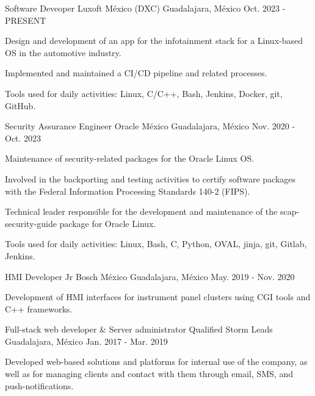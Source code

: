 \begin{cventries}
    \cventry
        {Software Deveoper}
        {Luxoft México (DXC)}
        {Guadalajara, México}
        {Oct. 2023 - PRESENT}
        {
            \begin{cvitems}
                \item {Design and development of an app for the infotainment stack for a Linux-based OS in the automotive industry.}
                \item {Implemented and maintained a CI/CD pipeline and related processes.}
                \item {Tools used for daily activities: Linux, C/C++, Bash, Jenkins, Docker, git, GitHub.}
            \end{cvitems}
        }
    \cventry
        {Security Assurance Engineer}
        {Oracle México}
        {Guadalajara, México}
        {Nov. 2020 - Oct. 2023}
        {
            \begin{cvitems}
                \item {Maintenance of security-related packages for the Oracle Linux OS.}
                \item {Involved in the backporting and testing activities to certify software packages with the Federal Information Processing Standards 140-2 (FIPS).}
                \item {Technical leader responsible for the development and maintenance of the scap-security-guide package for Oracle Linux.}
                \item {Tools used for daily activities: Linux, Bash, C, Python, OVAL, jinja, git, Gitlab, Jenkins.}
            \end{cvitems}
        }
    \cventry
        {HMI Developer Jr}
        {Bosch México}
        {Guadalajara, México}
        {May. 2019 - Nov. 2020}
        {
            \begin{cvitems}
                \item {Development of HMI interfaces for instrument panel clusters using CGI tools and C++ frameworks.}
            \end{cvitems}
        }
    \cventry
        {Full-stack web developer \& Server administrator}
        {Qualified Storm Leads}
        {Guadalajara, México}
        {Jan. 2017 - Mar. 2019}
        {
            \begin{cvitems}
                \item {Developed web-based solutions and platforms for internal use of the company, as well as for managing clients and contact with them through email, SMS, and push-notifications.}

\end{cvitems}}
\end{cventries}
